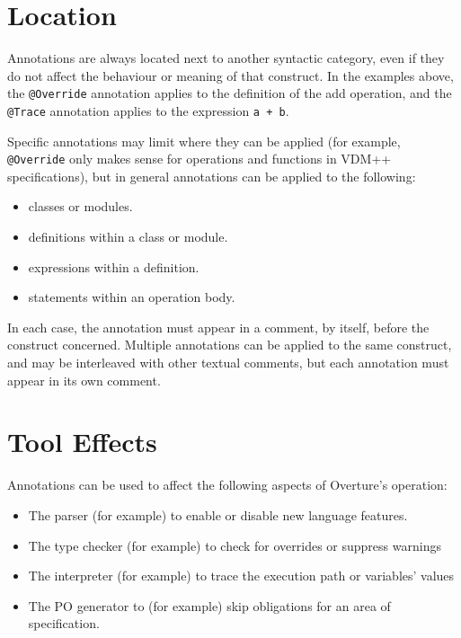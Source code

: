 \section{Location}

Annotations are always located next to another syntactic category,
even if they do not affect the behaviour or meaning of that
construct. In the examples above, the
\lstinline[language=VDM++]|@Override| annotation applies to the
definition of the add operation, and the
\lstinline[language=VDM++]|@Trace| annotation applies to the
expression \lstinline[language=VDM++]|a + b|.

Specific annotations may limit where they can be applied (for example,
\lstinline[language=VDM++]|@Override| only makes sense for operations
and functions in VDM++ specifications), but in general annotations can
be applied to the following:

\begin{itemize}
  \item classes or modules.
  \item definitions within a class or module.
  \item expressions within a definition.
  \item statements within an operation body.
\end{itemize}

In each case, the annotation must appear in a comment, by itself,
before the construct concerned. Multiple annotations can be applied to
the same construct, and may be interleaved with other textual
comments, but each annotation must appear in its own comment.

\section{Tool Effects}

Annotations can be used to affect the following aspects of Overture's
operation:

\begin{itemize}
  \item The parser (for example) to enable or disable new language
  features.
  \item The type checker (for example) to check for overrides or
  suppress warnings
  \item The interpreter (for example) to trace the execution path or
  variables' values
  \item The PO generator to (for example) skip obligations for an area
  of specification.
\end{itemize}

